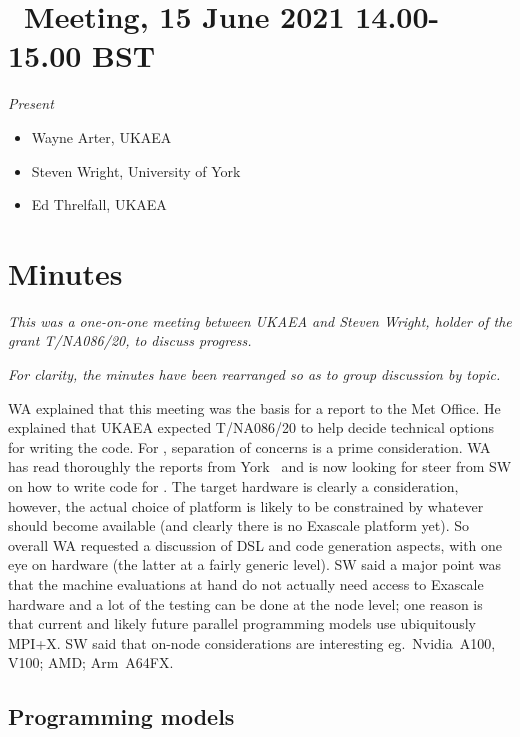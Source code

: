 \section{{\nep \ Meeting, 15 June 2021 14.00-15.00 BST}}

\emph{Present}

\begin{itemize}
\item{Wayne Arter, UKAEA}
\item{Steven Wright, University of York}
\item{Ed Threlfall, UKAEA}
\end{itemize}

\section{Minutes}

{\it This was a one-on-one meeting between UKAEA and Steven Wright, holder of 
the grant T/NA086/20, to discuss progress.}

\emph{For clarity, the minutes have been rearranged
so as to group discussion by topic.}

WA explained that this meeting was the basis for a report to the Met 
Office.  He explained that UKAEA expected  T/NA086/20 to help
decide technical options for writing the code.
For \nep, separation of concerns is a prime consideration.
 WA has read thoroughly the 
reports from York~\cite{2047358-TN-01,2047358-TN-02} and is now looking for
steer from SW on how to write 
code for \nep.  The target hardware is clearly a consideration, however, the actual choice of 
platform is likely to be constrained by whatever should become available (and 
clearly there is no Exascale platform yet).  So overall WA requested a 
discussion of DSL and  code generation aspects, with one eye on hardware (the 
latter at a fairly generic level).
SW said a major point was that the machine evaluations at hand do not actually need 
access to Exascale hardware and a lot of the testing can be done at the node 
level; one reason is that current and likely future parallel programming models 
use ubiquitously MPI+X.  SW said that on-node considerations are interesting 
eg.\ Nvidia~A100, V100; AMD; Arm~A64FX. 


\subsection{Programming models}\label{sec:progmodel}

